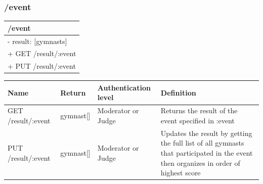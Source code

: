 \documentclass[letterpaper,10pt,draftclsnofoot,onecolumn,]{article}
\begin{document}
\subsubsection{/event}
\begin{center}
    \begin{tabular}{| p{20em} |}
    \hline
    \textbf{/event} \\
    \hline
    - result: [{gymnasts}] \\
    \hline
    + GET /result/:event \\
    + PUT /result/:event \\
    \hline
    \end{tabular}
\end{center}
\begin{center}
    \begin{tabular}{ | p{15em} | p{8em} | p{7em} | p{20em} | }
    \hline
    \textbf{Name} & \textbf{Return} & \textbf{Authentication level} & \textbf{Definition} \\
    \hline
    GET /result/:event & gymnast[] & Moderator or Judge & Returns the result of the event specified in :event \\
    \hline
    PUT /result/:event & gymnast[] & Moderator or Judge & Updates the result by getting the full list of all gymnasts that participated in the event then organizes in order of highest score \\
    \hline
    \end{tabular}
\end{center}
\end{document}
